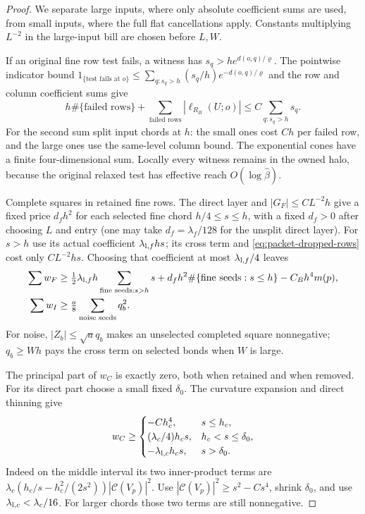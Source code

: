 \documentclass[11pt,reqno]{amsart}
\numberwithin{equation}{section}
\theoremstyle{definition}
\theoremstyle{remark}
\begin{document}
\begin{proof}
We separate large inputs, where only absolute coefficient sums
are used, from small inputs, where the full flat cancellations
apply. Constants multiplying \(L^{-2}\) in the large-input
bill are chosen before \(L,W\).

If an original fine row test fails, a witness has
\(s_q>h e^{d(o,q)/\varrho}\). The pointwise indicator bound
\(1_{\{\text{test fails at }o\}}\le
 \sum_{q:s_q>h}(s_q/h)e^{-d(o,q)/\varrho}\)
and the row and column coefficient sums give
\begin{equation}
 h\#\{\text{failed rows}\}
       +\sum_{\text{failed rows}}|\ell_{R_B}(U;o)|
                                      \le C\sum_{q:s_q>h}s_q.
 \label{eq:packet-dropped-rows}
\end{equation}
For the second sum split input chords at \(h\): the small
ones cost \(Ch\) per failed row, and the large ones use the
same-level column bound. The exponential cones have a finite
four-dimensional sum. Locally every witness remains in the
owned halo, because the original relaxed test has effective
reach \(O(\log\widehat\beta)\).

Complete squares in retained fine rows. The direct layer and
\(|G_F|\le CL^{-2}h\) give a fixed price
\(d_fh^2\) for each selected fine chord \(h/4\le s\le h\),
with a fixed \(d_f>0\) after choosing \(L\) and entry
(one may take \(d_f=\lambda_f/128\) for the unsplit direct layer).
For \(s>h\) use its actual coefficient
\(\lambda_{{\rm l},f}hs\); its cross term and
\eqref{eq:packet-dropped-rows} cost only \(CL^{-2}hs\).
Choosing that coefficient at most \(\lambda_{{\rm l},f}/4\)
leaves
\begin{align}
 \sum w_F&\ge\tfrac12\lambda_{{\rm l},f}h
                     \sum_{\text{fine seeds}:s>h}s
         +d_fh^2\#\{\text{fine seeds}:s\le h\}-C_Bh^4m(p),\notag\\
 \sum w_I&\ge\tfrac a8\sum_{\text{noise seeds}}q_b^2.
 \label{eq:packet-fine-noise-payment}
\end{align}
For noise, \(|Z_b|\le\sqrt a q_b\) makes an unselected
completed square nonnegative; \(q_b\ge Wh\) pays the cross
term on selected bonds when \(W\) is large.

The principal part of \(w_C\) is exactly zero, both when
retained and when removed. For its direct part choose a small
fixed \(\delta_0\). The curvature expansion and direct
thinning give
\begin{equation}
 w_C\ge\begin{cases}
    -Ch_c^4,&s\le h_c,\\
    (\lambda_c/4)h_cs,&h_c<s\le\delta_0,\\
    -\lambda_{{\rm l},c}h_cs,&s>\delta_0.
          \end{cases}
 \label{eq:packet-coarse-payment}
\end{equation}
Indeed on the middle interval its two inner-product terms are
\(\lambda_c(h_c/s-h_c^2/(2s^2))|\mathcal C(V_p)|^2\).
Use \(|\mathcal C(V_p)|^2\ge s^2-Cs^4\), shrink \(\delta_0\),
and use \(\lambda_{{\rm l},c}<\lambda_c/16\). For larger
chords those two terms are still nonnegative.


\end{proof}
\end{document}
